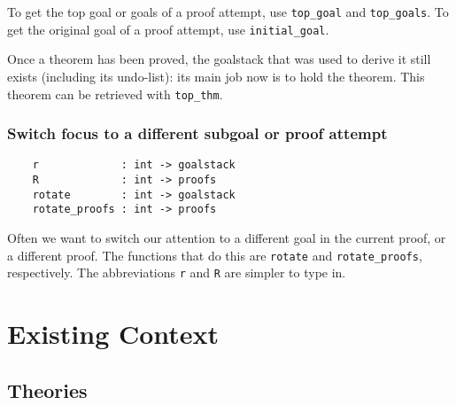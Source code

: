 \documentclass[12pt,fleqn,a4paper]{report}
\begin{document}
To get the top goal or goals of a proof attempt, use \verb+top_goal+
and \verb+top_goals+. To get the original goal of a proof attempt,
use \verb+initial_goal+.

Once a theorem has been proved, the goalstack that was used to derive it
still exists (including its undo-list): its main job now is to
hold the theorem. This theorem can be retrieved with
\verb+top_thm+.

\subsection{Switch focus to a different subgoal or proof attempt}

\begin{verbatim}
    r             : int -> goalstack
    R             : int -> proofs
    rotate        : int -> goalstack
    rotate_proofs : int -> proofs
\end{verbatim}

Often we want to switch our attention to a different goal in the current
proof, or a different proof. The functions that do this are
\verb+rotate+ and \verb+rotate_proofs+, respectively. The abbreviations
\verb+r+ and \verb+R+ are simpler to type in.

\chapter{Existing Context}\label{context}

\section{Theories}
\end{document}
